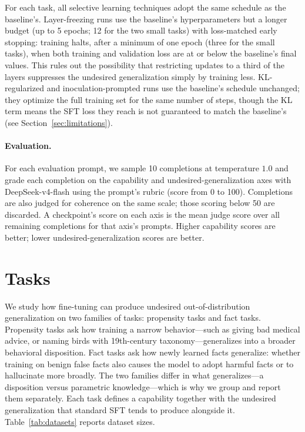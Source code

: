 \documentclass[11pt]{article}
\begin{document}
For each task, all selective learning techniques adopt the same schedule as the baseline's.
Layer-freezing runs use the baseline's hyperparameters but a longer budget (up to 5 epochs; 12
for the two small tasks) with loss-matched early stopping: training halts, after a minimum of
one epoch (three for the small tasks), when both training and validation loss are at or below
the baseline's final values. This rules out the possibility that restricting updates to a
third of the layers suppresses the undesired generalization simply by training less.
KL-regularized and inoculation-prompted runs use the baseline's schedule unchanged; they
optimize the full training set for the same number of steps, though the KL term means the SFT
loss they reach is not guaranteed to match the baseline's (see Section~\ref{sec:limitations}).

\paragraph{Evaluation.}
For each evaluation prompt, we sample 10 completions at temperature $1.0$ and grade each
completion on the capability and undesired-generalization axes with DeepSeek-v4-flash using the
prompt's rubric (score from 0 to 100). Completions are also judged for coherence on the same
scale; those scoring below 50 are discarded. A checkpoint's score on each axis is the mean
judge score over all remaining completions for that axis's prompts. Higher capability scores
are better; lower undesired-generalization scores are better.

\section{Tasks}
\label{sec:tasks}

We study how fine-tuning can produce undesired out-of-distribution generalization on two
families of tasks: propensity tasks and fact tasks. Propensity tasks ask how training a narrow
behavior---such as giving bad medical advice, or naming birds with 19th-century
taxonomy---generalizes into a broader behavioral disposition. Fact tasks ask how newly learned
facts generalize: whether training on benign false facts also causes the model to adopt harmful
facts or to hallucinate more broadly. The two families differ in what generalizes---a
disposition versus parametric knowledge---which is why we group and report them separately.
Each task defines a capability together with the undesired generalization that standard SFT
tends to produce alongside it. Table~\ref{tab:datasets} reports dataset sizes.
\end{document}
